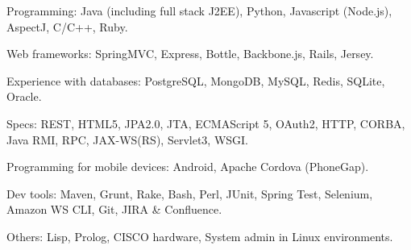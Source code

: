 \begin{rlist}
  \item Programming: Java (including full stack J2EE), Python, Javascript (Node.js),
  AspectJ, C/C++, Ruby.
  \item Web frameworks: SpringMVC, Express, Bottle, Backbone.js, Rails, Jersey.
  \item Experience with databases: PostgreSQL, MongoDB, MySQL, Redis, SQLite, Oracle.
  \item Specs: REST, HTML5, JPA2.0, JTA, ECMAScript 5, OAuth2, HTTP,
  CORBA, Java RMI, RPC, JAX-WS(RS), Servlet3, WSGI.
  \item Programming for mobile devices: Android, Apache Cordova (PhoneGap).
  \item Dev tools: Maven, Grunt, Rake, Bash, Perl, JUnit, Spring Test,
  Selenium, Amazon WS CLI, Git, JIRA \& Confluence.
  \item Others: Lisp, Prolog, CISCO hardware, System admin in Linux
  environments.
\end{rlist}

